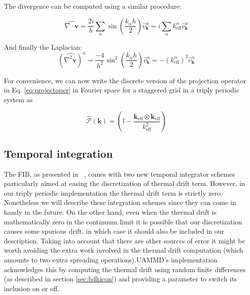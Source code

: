 \documentclass[ twoside,openright,titlepage,numbers=noenddot,%
headinclude,footinclude,cleardoublepage=empty,abstract=on,
BCOR=5mm,paper=b5,fontsize=11pt, dvipsnames
]{scrreprt}
\renewcommand{\vec}[1]{\bm{#1}}
\newcommand{\oper}[1]{\mathcal{#1}}
\newcommand{\uammd}{\gls{UAMMD}\xspace}
\newcommand{\fou}[1]{\widehat{#1}}
\begin{document}
The divergence can be computed using a similar procedure:

\begin{equation}
  \label{eq:staggereddivfou}
  \fou{\nabla\cdot\vec{v}} = \frac{2i}{h}\sum_\alpha\sin\left(\frac{k_\alpha h}{2}\right)\fou{v}_{\vec{k}}^\alpha = i \sum_\alpha k^\alpha_{\text{eff}}\fou{v}_{\vec{k}}^\alpha
\end{equation}

And finally the Laplacian:
\begin{equation}
  \label{eq:staggeredlapfou}
  \left(\fou{\nabla^2\vec{v}}\right)^ \alpha = \frac{-4}{h^2}\sin^2\left(\frac{k_\alpha h}{2}\right)\fou{v}_{\vec{k}}^\alpha = - \left(k^\alpha_{\text{eff}}\right)^2\fou{v}_{\vec{k}}^\alpha
\end{equation}

For convenience, we can now write the discrete version of the projection operator in Eq. \eqref{eq:projectoper} in Fourier space for a staggered grid in a triply periodic system as

\begin{equation}
  \label{eq:staggeredprojection}
  \fou{\oper{P}}(\vec{k}) = \left(\mathbb{I} - \frac{\vec{k}_{\text{eff}}\otimes\vec{k}_{\text{eff}}}{k_{\text{eff}}^2}\right)
\end{equation}
\subsection*{Temporal integration}
The \gls{FIB}, as presented in ~\cite{Delong2014}, comes with two new temporal integrator schemes particularly aimed at easing the discretization of thermal drift term. However, in our triply periodic implementation the thermal drift term is strictly zero. Nonetheless we will describe these integration schemes since they can come in handy in the future. On the other hand, even when the thermal drift is mathematically zero in the continuum limit it is possible that our discretization causes some spurious drift, in which case it should also be included in our description.
Taking into account that there are other sources of error it might be worth avoiding the extra work involved in the thermal drift computation (which amounts to two extra spreading operations).\uammd's implementation acknowledges this by computing the thermal drift using random finite differences (as described in section \ref{sec:bdhicon}) and providing a parameter to switch its inclusion on or off.
\end{document}
